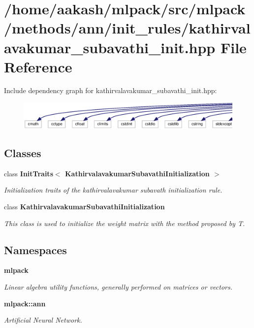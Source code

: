 \section{/home/aakash/mlpack/src/mlpack/methods/ann/init\+\_\+rules/kathirvalavakumar\+\_\+subavathi\+\_\+init.hpp File Reference}
\label{kathirvalavakumar__subavathi__init_8hpp}
Include dependency graph for kathirvalavakumar\+\_\+subavathi\+\_\+init.\+hpp\+:
\nopagebreak
\begin{figure}[H]
\begin{center}
\leavevmode
\includegraphics[width=350pt]{kathirvalavakumar__subavathi__init_8hpp__incl}
\end{center}
\end{figure}
\subsection*{Classes}
\begin{DoxyCompactItemize}
\item 
class \textbf{ Init\+Traits$<$ Kathirvalavakumar\+Subavathi\+Initialization $>$}
\begin{DoxyCompactList}\small\item\em Initialization traits of the kathirvalavakumar subavath initialization rule. \end{DoxyCompactList}\item 
class \textbf{ Kathirvalavakumar\+Subavathi\+Initialization}
\begin{DoxyCompactList}\small\item\em This class is used to initialize the weight matrix with the method proposed by T. \end{DoxyCompactList}\end{DoxyCompactItemize}
\subsection*{Namespaces}
\begin{DoxyCompactItemize}
\item 
 \textbf{ mlpack}
\begin{DoxyCompactList}\small\item\em Linear algebra utility functions, generally performed on matrices or vectors. \end{DoxyCompactList}\item 
 \textbf{ mlpack\+::ann}
\begin{DoxyCompactList}\small\item\em Artificial Neural Network. \end{DoxyCompactList}\end{DoxyCompactItemize}


